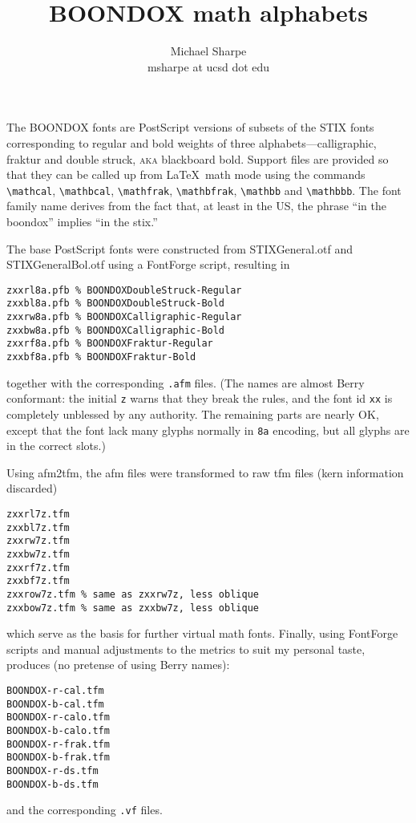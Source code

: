 \documentclass[11pt]{article}
\title{BOONDOX math alphabets}
\author{Michael Sharpe\\
msharpe at ucsd dot edu}
\date{}
\begin{document}
\maketitle
The BOONDOX fonts are PostScript versions of subsets of the STIX fonts corresponding to regular and bold weights of three alphabets---calligraphic, fraktur and double struck, \textsc{aka} blackboard bold. Support files are provided so that they can be called up from \LaTeX\ math mode using the commands \verb|\mathcal|, \verb|\mathbcal|, \verb|\mathfrak|, \verb|\mathbfrak|, \verb|\mathbb| and \verb|\mathbbb|. The font family name derives from the fact that, at least in the US, the phrase ``in the boondox'' implies ``in the stix.''

The base PostScript fonts were constructed from \textsf{STIXGeneral.otf} and \textsf{STIXGeneralBol.otf} using a \textsf{FontForge} script, resulting in 
\begin{verbatim}
zxxrl8a.pfb % BOONDOXDoubleStruck-Regular
zxxbl8a.pfb % BOONDOXDoubleStruck-Bold
zxxrw8a.pfb % BOONDOXCalligraphic-Regular
zxxbw8a.pfb % BOONDOXCalligraphic-Bold
zxxrf8a.pfb % BOONDOXFraktur-Regular
zxxbf8a.pfb % BOONDOXFraktur-Bold
\end{verbatim}
together with the corresponding {\tt.afm} files. (The names are almost Berry conformant: the initial {\tt z} warns that they break the rules, and the font id {\tt xx} is completely unblessed by any authority. The remaining parts are nearly OK, except that the font lack many glyphs normally in {\tt 8a} encoding, but all glyphs are in the correct slots.)

Using \textsf{afm2tfm}, the afm files were transformed to raw tfm files (kern information discarded)
\begin{verbatim}
zxxrl7z.tfm
zxxbl7z.tfm
zxxrw7z.tfm
zxxbw7z.tfm
zxxrf7z.tfm
zxxbf7z.tfm
zxxrow7z.tfm % same as zxxrw7z, less oblique
zxxbow7z.tfm % same as zxxbw7z, less oblique
\end{verbatim}
which serve as the basis for further virtual math fonts. Finally, using \textsf{FontForge} scripts and manual adjustments to the metrics to suit my personal taste, produces (no pretense of using Berry names):
\begin{verbatim}
BOONDOX-r-cal.tfm
BOONDOX-b-cal.tfm
BOONDOX-r-calo.tfm
BOONDOX-b-calo.tfm
BOONDOX-r-frak.tfm
BOONDOX-b-frak.tfm
BOONDOX-r-ds.tfm
BOONDOX-b-ds.tfm
\end{verbatim}
and the corresponding {\tt.vf} files. 
\end{document}
